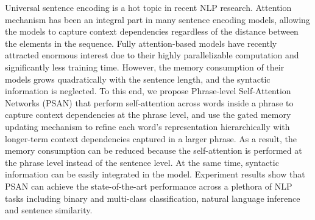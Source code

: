 Universal sentence encoding is a hot topic in recent NLP research. Attention mechanism has been an integral part in many sentence encoding models, allowing the models to capture context dependencies regardless of the distance between the elements in the sequence. Fully attention-based models have recently attracted enormous interest due to their highly parallelizable computation and significantly less training time. However, the memory consumption of their models grows quadratically with the sentence length, and the syntactic information is neglected. To this end, we propose Phrase-level Self-Attention Networks (PSAN) that perform self-attention across words inside a phrase to capture context dependencies at the phrase level, and use the gated memory updating mechanism to refine each word's representation hierarchically with longer-term context dependencies captured in a larger phrase. As a result, the memory consumption can be reduced because the self-attention is performed at the phrase level instead of the sentence level. At the same time, syntactic information can be easily integrated in the model. Experiment results show that PSAN can achieve the state-of-the-art performance across a plethora of NLP tasks including binary and multi-class classification, natural language inference and sentence similarity.
